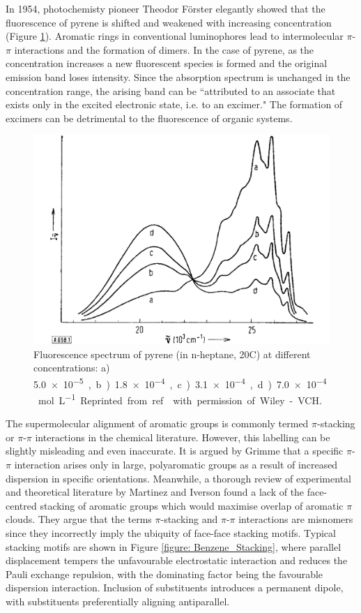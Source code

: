 In 1954, photochemisty pioneer Theodor F\"{o}rster elegantly showed that the fluorescence of pyrene is shifted and weakened with increasing concentration (Figure \ref{figure: Forster_Spectra}).\cite{Forster1954,Forster1969} Aromatic rings in conventional luminophores lead to intermolecular $\pi$-$\pi$ interactions and the formation of dimers. In the case of pyrene, as the concentration increases a new fluorescent species is formed and the original emission band loses intensity. Since the absorption spectrum is unchanged in the concentration range, the arising band can be ``attributed to an associate that exists only in the excited electronic state, i.e. to an excimer."\cite{Forster1969} The formation of excimers can be detrimental to the fluorescence of organic systems.
\begin{figure}[t]
\centering
  \includegraphics[width=0.6\linewidth]{1Intro/Forster_Spectra.pdf}
  \caption[Fluorescence spectrum of pyrene]{Fluorescence spectrum of pyrene (in n-heptane, 20\degree{}C) at different concentrations: a) \SI{5.0e-5}, b) \SI{1.8e-4}, c) \SI{3.1e-4}, d) \SI{7.0e-4}{mol L^{-1}}. Reprinted from ref.~ with permission of Wiley-VCH.}
  \label{figure: Forster_Spectra}
\end{figure}
The supermolecular alignment of aromatic groups is commonly termed $\pi$-stacking or $\pi$-$\pi$ interactions in the chemical literature. However, this labelling can be slightly misleading and even inaccurate.\cite{Grimme2008,Martinez2012} It  is argued by Grimme that a specific $\pi$-$\pi$ interaction arises only in large, polyaromatic groups as a result of increased dispersion in specific orientations.\cite{Grimme2008} Meanwhile, a thorough review of experimental and theoretical literature by Martinez and Iverson found a lack of the face-centred stacking of aromatic groups which would maximise overlap of aromatic $\pi$ clouds.\cite{Martinez2012} They argue that the terms $\pi$-stacking and $\pi$-$\pi$ interactions are misnomers since they incorrectly imply the ubiquity of face-face stacking motifs. Typical stacking motifs are shown in Figure \ref{figure: Benzene_Stacking}, where parallel displacement tempers the unfavourable electrostatic interaction and reduces the Pauli exchange repulsion, with the dominating factor being the favourable dispersion interaction. Inclusion of substituents introduces a permanent dipole, with substituents preferentially aligning antiparallel.\cite{Martinez2012}

